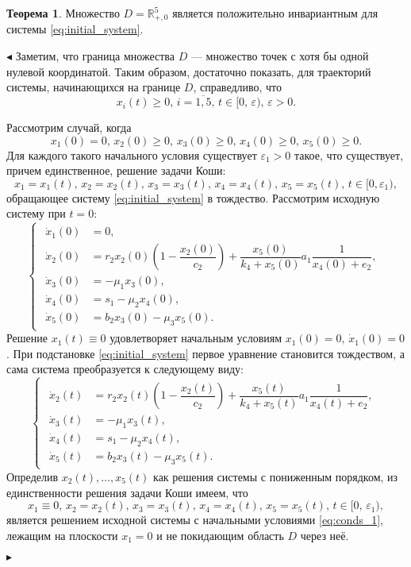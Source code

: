 \documentclass[12pt,a4paper]{extarticle}
\renewenvironment{proof}{\noindent$\blacktriangleleft$}{$\blacktriangleright$}
\theoremstyle{definition}
\newtheorem{theorem}{Теорема}
\theoremstyle{definition}
\theoremstyle{definition}
\begin{document}
	\begin{theorem}
		Множество $D=\mathbb{R}^5_{+,0}$ является положительно инвариантным для системы \ref{eq:initial_system}.
	\end{theorem}
	\begin{proof}
		Заметим, что граница множества $D$ --- множество точек с хотя бы одной нулевой координатой. Таким образом, достаточно показать, для траекторий системы, начинающихся на границе $D$, справедливо, что 
		\[x_i(t)\ge0,\, i=\overline{1,5},\, t\in[0,\,\varepsilon),\,\varepsilon>0.\]
		
		Рассмотрим случай, когда
		\begin{equation}\label{eq:conds_1}
			x_1(0)=0,\, x_2(0)\ge0,\, x_3(0)\ge0,\, x_4(0)\ge0,\, x_5(0)\ge0.
		\end{equation}
		Для каждого такого начального условия существует $\varepsilon_1>0$ такое, что существует, причем единственное, решение задачи Коши: 
		\[x_1=x_1(t),\, x_2=x_2(t),\, x_3=x_3(t),\, x_4=x_4(t),\, x_5=x_5(t),\, t\in[0,\varepsilon_1),\]
		обращающее систему \ref{eq:initial_system} в тождество. Рассмотрим исходную систему при $t=0$:
		\begin{equation*}
			\begin{cases}
				\begin{aligned}
					\dot{x}_1(0) &= 0,\\
					\dot{x}_2(0) &= r_2x_2(0)\left(1-\dfrac{x_2(0)}{c_2}\right)+\dfrac{x_5(0)}{k_4+x_5(0)}a_1\dfrac{1}{x_4(0)+e_2},\\
					\dot{x}_3(0) &= -\mu_1x_3(0),\\
					\dot{x}_4(0) &= s_1 - \mu_2x_4(0),\\
					\dot{x}_5(0) &= b_2x_3(0) - \mu_3x_5(0).
				\end{aligned}
			\end{cases}
		\end{equation*}
		Решение $x_1(t)\equiv0$ удовлетворяет начальным условиям $x_1(0)=0,\,\dot{x}_1(0)=0$. При подстановке \ref{eq:initial_system} первое уравнение становится тождеством, а сама система преобразуется к следующему виду:
		\begin{equation*}
			\begin{cases}
				\begin{aligned}
					\dot{x}_2(t) &= r_2x_2(t)\left(1-\dfrac{x_2(t)}{c_2}\right)+\dfrac{x_5(t)}{k_4+x_5(t)}a_1\dfrac{1}{x_4(t)+e_2},\\
					\dot{x}_3(t) &= -\mu_1x_3(t),\\
					\dot{x}_4(t) &= s_1 - \mu_2x_4(t),\\
					\dot{x}_5(t) &= b_2x_3(t)-\mu_3x_5(t).
				\end{aligned}
			\end{cases}
		\end{equation*} 
		Определив $x_2(t),\dots,x_5(t)$ как решения системы с пониженным порядком, из единственности решения задачи Коши имеем, что
		\[x_1\equiv0,\, x_2=x_2(t),\, x_3=x_3(t),\, x_4=x_4(t),\, x_5=x_5(t),\, t\in[0,\,\varepsilon_1),\]
		является решением исходной системы с начальными условиями \ref{eq:conds_1}, лежащим на плоскости $x_1=0$ и не покидающим область $D$ через неё.
		

\end{proof}
\end{document}
